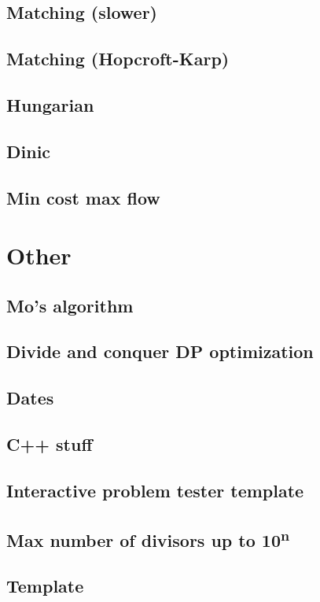 \subsection{Matching (slower)}
\subsection{Matching (Hopcroft-Karp)}
\subsection{Hungarian}
\subsection{Dinic}
\subsection{Min cost max flow}

\section{Other}
\subsection{Mo's algorithm}
\subsection{Divide and conquer DP optimization}
\subsection{Dates}
\subsection{C++ stuff}
\subsection{Interactive problem tester template}
\subsection{Max number of divisors up to 10\textsuperscript{n}}
\subsection{Template}



